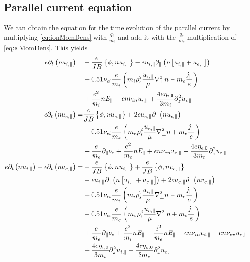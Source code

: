 \subsection{Parallel current equation}
%
We can obtain the equation for the time evolution of the parallel current by multiplying \cref{eq:ionMomDens} with $\frac{q_i}{m_i}$ and add it with the $\frac{q_e}{m_e}$ multiplication of \cref{eq:elMomDens}.
This yields
%
%
\begin{align*}
 e \partial_t\L( n u_{i,\|}\R)
 =&
 -\frac{e}{JB}\L\{\phi, n u_{i,\|}\R\}
 -e u_{i,\|}\partial_\|\L( n \L[u_{i,\|}+ u_{e,\|} \R]\R)
   \\&
 + 0.51 \nu_{ei}\frac{e}{m_i}\L(
   m_i \rho_s^2\frac{u_{i,\|}}{\mu} \grad_\perp^2 n
   - m_e \frac{j_\|}{e}
   \R)
   \\&
   +\frac{e^2}{m_i} n  E_\|
 - e n \nu_{i n}u_{i,\|}
 + \frac{4e\eta_{i,0}}{3m_i} \partial_z^2 u_{i,\|}
 \\
 -e \partial_t\L( n u_{e,\|}\R)
 =&
  \frac{e}{JB}\L\{\phi, n u_{e,\|}\R\}
 + 2e u_{e,\|}\partial_\|\L( n  u_{e,\|} \R)
   \\&
 - 0.51 \nu_{ei}\frac{e}{m_e}\L(
   m_e \rho_s^2\frac{u_{e,\|}}{\mu} \grad_\perp^2 n
   + m_e \frac{j_\|}{e}
   \R)
   \\&
   +\frac{e}{m_e} \partial_\| p_e
   + \frac{e^2}{m_e} n E_\|
 + en \nu_{e n}u_{e,\|}
 - \frac{4e\eta_{e,0}}{3m_e} \partial_z^2 u_{e,\|}
 \\
 e \partial_t\L( n u_{i,\|}\R)
 -e \partial_t\L( n u_{e,\|}\R)
 =&
 -\frac{e}{JB}\L\{\phi, n u_{i,\|}\R\}
 +\frac{e}{JB}\L\{\phi, n u_{e,\|}\R\}
   \\&
 -e u_{i,\|}\partial_\|\L( n \L[u_{i,\|}+ u_{e,\|} \R]\R)
 + 2e u_{e,\|}\partial_\|\L( n  u_{e,\|} \R)
   \\&
 + 0.51 \nu_{ei}\frac{e}{m_i}\L(
   m_i \rho_s^2\frac{u_{i,\|}}{\mu} \grad_\perp^2 n
   - m_e \frac{j_\|}{e}
   \R)
   \\&
 - 0.51 \nu_{ei}\frac{e}{m_e}\L(
   m_e \rho_s^2\frac{u_{e,\|}}{\mu} \grad_\perp^2 n
   + m_e \frac{j_\|}{e}
   \R)
   \\&
   +\frac{e}{m_e} \partial_\| p_e
   +\frac{e^2}{m_i} n  E_\|
   + \frac{e^2}{m_e}n E_\|
 - e n \nu_{i n}u_{i,\|}
 + en \nu_{e n}u_{e,\|}
   \\&
 + \frac{4e\eta_{i,0}}{3m_i} \partial_z^2 u_{i,\|}
 - \frac{4e\eta_{e,0}}{3m_e} \partial_z^2 u_{e,\|}
 \\

\end{align*}
